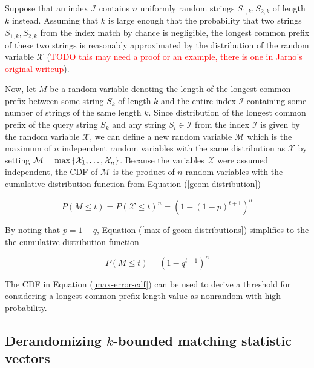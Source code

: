 \documentclass[unnumsec,webpdf,contemporary,large]{oup-authoring-template}%
\theoremstyle{thmstyleone}%
\theoremstyle{thmstyletwo}%
\theoremstyle{thmstylethree}%
\begin{document}
Suppose that an index $\mathcal{I}$ contains $n$ uniformly random strings $S_{1,k},S_{2,k}$ of length $k$ instead. Assuming that $k$ is large enough that the probability that two strings $S_{1,k},S_{2,k}$ from the index match by chance is negligible, the longest common prefix of these two strings is reasonably approximated by the distribution of the random variable $\mathcal{X}$ (\textcolor{red}{TODO this may need a proof or an example, there is one in Jarno's original writeup}).

Now, let $M$ be a random variable denoting the length of the longest common prefix between some string $S_{k}$ of length $k$ and the entire index $\mathcal{I}$ containing some number of strings of the same length $k$. 
Since distribution of the longest common prefix of the query string $S_k$ and any string $S_i \in \mathcal{I}$ from the index $\mathcal{I}$ is given by the random variable $\mathcal{X}$, 
we can define a new random variable $\mathcal{M}$ 
which is the maximum of $n$ independent random variables with the same distribution as 
$\mathcal{X}$ by setting 
$\mathcal{M} = \text{max}\left\{\mathcal{X}_1, \text{\textellipsis}, \mathcal{X}_n\right\}$. 
Because the variables $\mathcal{X}$ were assumed independent, the CDF of $\mathcal{M}$ is the product of $n$ random variables with the cumulative distribution function from Equation (\ref{geom-distribution})

\begin{equation}
    P\left(M \leq t\right) = P\left(\mathcal{X} \leq t\right)^n = \left(1 - \left(1 - p\right)^{t + 1}\right)^n
\label{max-of-geom-distributions}    
\end{equation}

By noting that $p = 1 - q$, Equation (\ref{max-of-geom-distributions}) simplifies to the the cumulative distribution function

\begin{equation}
    P\left(M \leq t\right) = \left(1 - q^{t + 1}\right)^n
\label{max-error-cdf}
\end{equation}

The CDF in Equation (\ref{max-error-cdf}) can be used to derive a threshold for considering a longest common prefix length value as nonrandom with high probability.

\subsection{\texorpdfstring{Derandomizing $k$-bounded matching statistic vectors}{Derandomizing k-bounded matching statistic vectors}}
\end{document}
